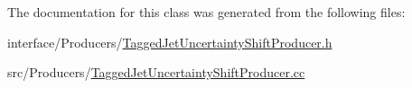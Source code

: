 The documentation for this class was generated from the following files:\begin{DoxyCompactItemize}
\item 
interface/Producers/\hyperlink{TaggedJetUncertaintyShiftProducer_8h}{TaggedJetUncertaintyShiftProducer.h}\item 
src/Producers/\hyperlink{TaggedJetUncertaintyShiftProducer_8cc}{TaggedJetUncertaintyShiftProducer.cc}\end{DoxyCompactItemize}
